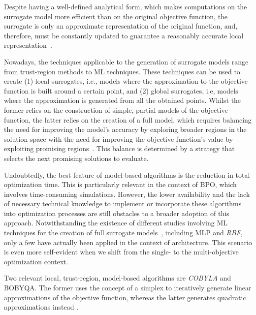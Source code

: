 Despite having a well-defined analytical form, which makes computations on the surrogate model more efficient than on the original objective function, the surrogate is only an approximate representation of the original function, and, therefore, must be constantly updated to guarantee a reasonably accurate local representation~\cite{Koziel2011}.

Nowadays, the techniques applicable to the generation of surrogate models range from trust-region methods to \ac{ML} techniques. These techniques can be used to create (1) local surrogates, i.e., models where the approximation to the objective function is built around a certain point, and (2) global surrogates, i.e, models where the approximation is generated from all the obtained points. Whilst the former relies on the construction of simple, partial models of the objective function, the latter relies on the creation of a full model, which requires balancing the need for improving the model's accuracy by exploring broader regions in the solution space with the need for improving the objective function's value by exploiting promising regions~\cite{Koziel2011}. This balance is determined by a strategy that selects the next promising solutions to evaluate. 

Undoubtedly, the best feature of model-based algorithms is the reduction in total optimization time. This is particularly relevant in the context of \ac{BPO}, which involves time-consuming simulations. However, the lower availability and the lack of necessary technical knowledge to implement or incorporate these algorithms into optimization processes are still obstacles to a broader adoption of this approach. Notwithstanding the existence of different studies involving \ac{ML} techniques for the creation of full surrogate models~\cite{Koziel2011, Forrester2009SBO}, including \ac{MLP} and \textit{\ac{RBF}}, only a few have actually been applied in the context of architecture. This scenario is even more self-evident when we shift from the single- to the multi-objective optimization context.

Two relevant local, trust-region, model-based algorithms are \textit{\ac{COBYLA}} and \ac{BOBYQA}. The former uses the concept of a simplex to iteratively generate linear approximations of the objective function, whereas the latter generates quadratic approximations instead \cite{Powell1994COBYLA, Powell2009BOBYQA}.

